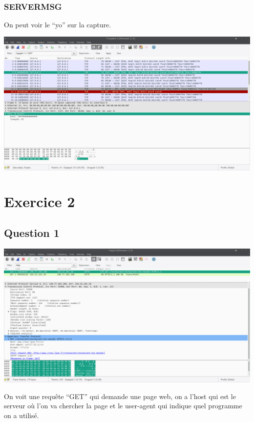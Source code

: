 \documentclass[10,a4paper]{article}
\begin{document}
\subsubsection*{SERVERMSG}
On peut voir le ``yo'' sur la capture.
\begin{center}
  \includegraphics[width=15cm]{exo1_4_servermsg.png}
\end{center}


\section*{Exercice 2}
\subsection*{Question 1}
\begin{center}
  \includegraphics[width=15cm]{exo2_1.png}
\end{center}
On voit une requête ``GET'' qui demande une page web, on a l'host qui est le serveur où l'on va chercher la page et le user-agent qui indique quel programme on a utilisé.
\end{document}
